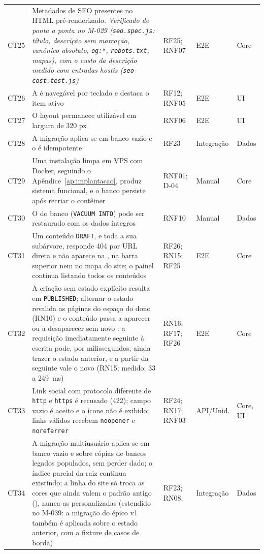 \begin{longtable}{@{}L{1.1cm}L{7.0cm}L{2.2cm}L{1.6cm}L{1.6cm}@{}}
CT25 & Metadados de SEO presentes no HTML pré-renderizado. \emph{Verificado de ponta a ponta no M-029 (\texttt{seo.spec.js}: título, descrição sem marcação, canônico absoluto, \texttt{og:*}, \texttt{robots.txt}, mapas), com o custo da descrição medido com entradas hostis (\texttt{seo-cost.test.js})} & RF25; RNF07 & E2E & Core\\[2pt]
CT26 & A  é navegável por teclado e destaca o item ativo & RF12; RNF05 & E2E & UI\\[2pt]
CT27 & O layout permanece utilizável em largura de 320 px & RNF06 & E2E & UI\\[2pt]
CT28 & A migração aplica-se em banco vazio e o  é idempotente & RF23 & Integração & Dados\\[2pt]
CT29 & Uma instalação limpa em VPS com Docker, seguindo o Apêndice~\ref{ap:implantacao}, produz sistema funcional, e o banco persiste após recriar o contêiner & RNF01; D-04 & Manual & Core\\[2pt]
CT30 & O  do banco (\texttt{VACUUM INTO}) pode ser restaurado com os dados íntegros & RNF10 & Manual & Dados\\[2pt]
CT31 & Um conteúdo \texttt{DRAFT}, e toda a sua subárvore, responde 404 por URL direta e não aparece na , na barra superior nem no mapa do site; o painel continua listando todos os conteúdos & RF26; RN15; RF25 & E2E & Core\\[2pt]
CT32 & A criação sem estado explícito resulta em \texttt{PUBLISHED}; alternar o estado revalida as páginas do espaço do dono (RN10) e o conteúdo passa a aparecer ou a desaparecer sem novo : a requisição imediatamente seguinte à escrita pode, por milissegundos, ainda trazer o estado anterior, e a partir da seguinte vale o novo (RN15; medido: 33 a 249~ms) & RN16; RF17; RF26 & E2E & Core\\[2pt]
CT33 & Link social com protocolo diferente de \texttt{http} e \texttt{https} é recusado (422); campo vazio é aceito e o ícone não é exibido; links válidos recebem \texttt{noopener} e \texttt{noreferrer} & RF24; RN17; RNF03 & API/Unid. & Core, UI\\[2pt]
CT34 & A migração multiusuário aplica-se em banco vazio e sobre cópias de bancos legados populados, sem perder dado; o índice parcial da raiz continua existindo; a linha do site só troca as cores que ainda valem o padrão antigo (), nunca as personalizadas (estendido no M-039: a migração do épico v1 também é aplicada sobre o estado anterior, com a fixture de casos de borda) & RF23; RN08;  & Integração & Dados\\[2pt]

\end{longtable}
